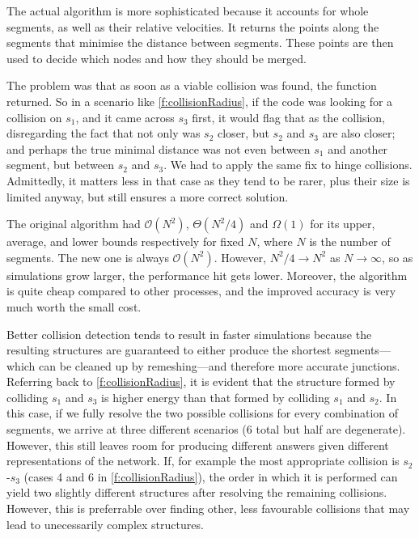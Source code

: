 The actual algorithm is more sophisticated because it accounts for whole segments, as well as their relative velocities. It returns the points along the segments that minimise the distance between segments. These points are then used to decide which nodes and how they should be merged.

The problem was that as soon as a viable collision was found, the function returned. So in a scenario like \cref{f:collisionRadius}, if the code was looking for a collision on $s_1$, and it came across $s_3$ first, it would flag that as the collision, disregarding the fact that not only was $s_2$ closer, but $s_2$ and $s_3$ are also closer; and perhaps the true minimal distance was not even between $s_1$ and another segment, but between $s_2$ and $s_3$. We had to apply the same fix to hinge collisions. Admittedly, it matters less in that case as they tend to be rarer, plus their size is limited anyway, but still ensures a more correct solution.

The original algorithm had $\mathcal{O}(N^2)$, $\mathcal{\Theta}(N^2/4)$ and $\mathcal{\Omega}(1)$ for its upper, average, and lower bounds respectively for fixed $N$, where $N$ is the number of segments. The new one is always $\mathcal{O}(N^2)$. However, $N^2/4 \to N^2$ as $N\to\infty$, so as simulations grow larger, the performance hit gets lower. Moreover, the algorithm is quite cheap compared to other processes, and the improved accuracy is very much worth the small cost.

Better collision detection tends to result in faster simulations because the resulting structures are guaranteed to either produce the shortest segments---which can be cleaned up by remeshing---and therefore more accurate junctions. Referring back to \cref{f:collisionRadius}, it is evident that the structure formed by colliding $s_1$ and $s_3$ is higher energy than that formed by colliding $s_1$ and $s_2$. In this case, if we fully resolve the two possible collisions for every combination of segments, we arrive at three different scenarios (6 total but half are degenerate). However, this still leaves room for producing different answers given different representations of the network. If, for example the most appropriate collision is $s_2$-$s_3$ (cases 4 and 6 in \cref{f:collisionRadius}), the order in which it is performed can yield two slightly different structures after resolving the remaining collisions. However, this is preferrable over finding other, less favourable collisions that may lead to unecessarily complex structures.

